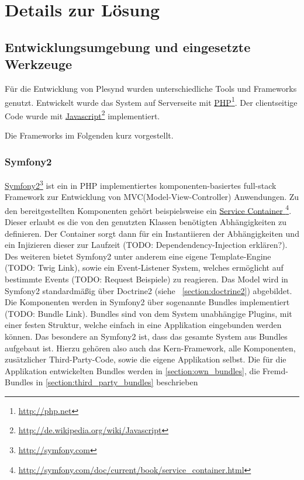 \chapter{Details zur Lösung} 
\label{chapter:Kapitel6}

\section{Entwicklungsumgebung und eingesetzte Werkzeuge}\label{section:entwicklungsumgebungen_tools}
Für die Entwicklung von Plesynd wurden unterschiedliche Tools und Frameworks genutzt. Entwickelt wurde das System auf Serverseite mit \href{http://php.net}{PHP}\footnote{\url{http://php.net}}. Der clientseitige Code wurde mit \href{http://de.wikipedia.org/wiki/Javascript}{Javascript}\footnote{\url{http://de.wikipedia.org/wiki/Javascript}} implementiert. 

Die Frameworks im Folgenden kurz vorgestellt.

\subsection{Symfony2}
\href{http://symfony.com}{Symfony2}\footnote{\url{http://symfony.com}} ist ein in PHP implementiertes komponenten-basiertes full-stack Framework zur Entwicklung von MVC(Model-View-Controller) Anwendungen. Zu den bereitgestellten Komponenten gehört beispielsweise ein \href{http://symfony.com/doc/current/book/service_container.html}{Service Container }\footnote{\url{http://symfony.com/doc/current/book/service_container.html}}. Dieser erlaubt es die von den genutzten Klassen benötigten Abhängigkeiten zu definieren. Der Container sorgt dann für ein Instantiieren der Abhängigkeiten und ein Injizieren dieser zur Laufzeit (TODO: Dependendency-Injection erklären?). Des weiteren bietet Symfony2 unter anderem eine eigene Template-Engine (TODO: Twig Link), sowie ein Event-Listener System, welches ermöglicht auf bestimmte Events (TODO: Request Beispiele) zu reagieren. Das Model wird in Symfony2 standardmäßig über Doctrine2 (siehe ~\ref{section:doctrine2}) abgebildet.
Die Komponenten werden in Symfony2 über sogenannte Bundles implementiert (TODO: Bundle Link). Bundles sind von dem System unabhängige Plugins, mit einer festen Struktur, welche einfach in eine Applikation eingebunden werden können. Das besondere an Symfony2 ist, dass das gesamte System aus Bundles aufgebaut ist. Hierzu gehören also auch das Kern-Framework, alle Komponenten, zusätzlicher Third-Party-Code, sowie die eigene Applikation selbst. Die für die Applikation entwickelten Bundles werden in \ref{section:own_bundles}, die Fremd-Bundles in \ref{section:third_party_bundles} beschrieben

